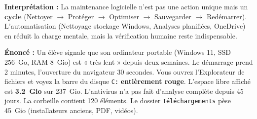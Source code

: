 \documentclass[11pt]{article}
\begin{document}
\begin{experience}
\textbf{Interprétation :} La maintenance logicielle n'est pas une action unique mais un \textbf{cycle} (Nettoyer $\rightarrow$ Protéger $\rightarrow$ Optimiser $\rightarrow$ Sauvegarder $\rightarrow$ Redémarrer). L'automatisation (Nettoyage stockage Windows, Analyses planifiées, OneDrive) en réduit la charge mentale, mais la vérification humaine reste indispensable.
\end{experience}

\begin{exoresolu}
\textbf{Énoncé :} Un élève signale que son ordinateur portable (Windows 11, SSD \SI{256}{Go}, RAM \SI{8}{Gio}) est « très lent » depuis deux semaines. Le démarrage prend 2 minutes, l'ouverture du navigateur 30 secondes. Vous ouvrez l'Explorateur de fichiers et voyez la barre du disque \texttt{C:} \textbf{entièrement rouge}. L'espace libre affiché est \textbf{\SI{3,2}{Gio}} sur \SI{237}{Gio}. L'antivirus n'a pas fait d'analyse complète depuis 45 jours. La corbeille contient 120 éléments. Le dossier \texttt{Téléchargements} pèse \SI{45}{Gio} (installateurs anciens, PDF, vidéos).


\end{exoresolu}
\end{document}
